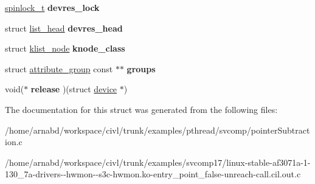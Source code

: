 \begin{DoxyCompactItemize}
\item 
\hypertarget{structdevice_a0624d5dbda2dd343dab4a81d077b3888}{}\hyperlink{structspinlock}{spinlock\+\_\+t} {\bfseries devres\+\_\+lock}\label{structdevice_a0624d5dbda2dd343dab4a81d077b3888}

\item 
\hypertarget{structdevice_a475f0af38844b13754e292dee5d09c82}{}struct \hyperlink{structlist__head}{list\+\_\+head} {\bfseries devres\+\_\+head}\label{structdevice_a475f0af38844b13754e292dee5d09c82}

\item 
\hypertarget{structdevice_a0a8e2b72d5c10ea02fad16a99893d8d8}{}struct \hyperlink{structklist__node}{klist\+\_\+node} {\bfseries knode\+\_\+class}\label{structdevice_a0a8e2b72d5c10ea02fad16a99893d8d8}

\item 
\hypertarget{structdevice_a89a0b792985e00268bedbd813c85f928}{}struct \hyperlink{structattribute__group}{attribute\+\_\+group} const $\ast$$\ast$ {\bfseries groups}\label{structdevice_a89a0b792985e00268bedbd813c85f928}

\item 
\hypertarget{structdevice_a615ea6375bff3cf3ee502245a6a0b8ee}{}void($\ast$ {\bfseries release} )(struct \hyperlink{structdevice}{device} $\ast$)\label{structdevice_a615ea6375bff3cf3ee502245a6a0b8ee}

\end{DoxyCompactItemize}


The documentation for this struct was generated from the following files\+:\begin{DoxyCompactItemize}
\item 
/home/arnabd/workspace/civl/trunk/examples/pthread/svcomp/pointer\+Subtraction.\+c\item 
/home/arnabd/workspace/civl/trunk/examples/svcomp17/linux-\/stable-\/af3071a-\/1-\/130\+\_\+7a-\/drivers-\/-\/hwmon-\/-\/s3c-\/hwmon.\+ko-\/entry\+\_\+point\+\_\+false-\/unreach-\/call.\+cil.\+out.\+c\end{DoxyCompactItemize}
